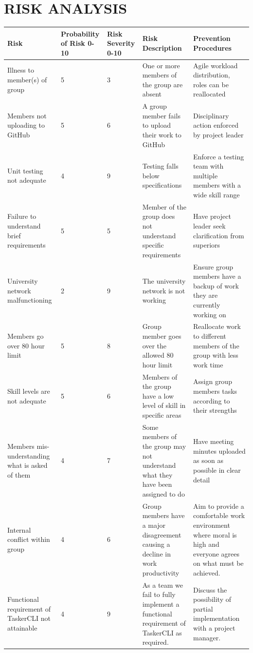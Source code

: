 \documentclass{project}
\begin{document}
\section{RISK ANALYSIS}
\begin{longtable}{ | p{3cm} | p{2cm} | p{2cm} | p{4cm} | p{4cm} |  }
  \hline
  \textbf{Risk} & \textbf{Probability of Risk 0-10} & \textbf{Risk Severity 0-10} & \textbf{Risk Description} & \textbf{Prevention Procedures} \\ \hline
Illness to member(s) of group & 5 & 3 & One or more members of the group are absent & Agile workload distribution, roles can be reallocated \\ \hline
Members not uploading to GitHub & 5 & 6 & A group member fails to upload their work to GitHub & Disciplinary action enforced by project leader \\ \hline
Unit testing not adequate & 4 & 9 & Testing falls below specifications & Enforce a testing team with multiple members with a wide skill range \\ \hline
Failure to understand brief requirements & 5 & 5 & Member of the group does not understand specific requirements & Have project leader seek clarification from superiors \\ \hline
University network malfunctioning & 2 & 9 & The university network is not working & Ensure group members have a backup of work they are currently working on \\ \hline
Members go over 80 hour limit & 5 & 8 & Group member goes over the allowed 80 hour limit & Reallocate work to different members of the group with less work time \\ \hline
Skill levels are not adequate & 5 & 6 & Members of the group have a low level of skill in specific areas
& Assign group members tasks according to their strengths \\ \hline
Members mis-understanding what is asked of them & 4 & 7 & Some members of the group may not understand what they have been assigned to do &  Have meeting minutes uploaded as soon as possible in clear detail\\ \hline
Internal conflict within group & 4 & 6 & Group members have a major disagreement causing a decline in work productivity & Aim to provide a comfortable work environment where moral is high and everyone agrees on what must be achieved.\\ \hline
Functional requirement of TaskerCLI not attainable & 4 & 9 & As a team we fail to fully implement a functional requirement of TaskerCLI as required\cite{se.qa.rs}. & Discuss the possibility of partial implementation with a project manager. \\ \hline

\end{longtable}
\end{document}
